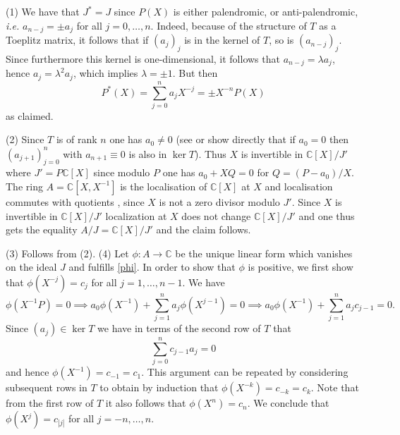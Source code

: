 \documentclass{amsart}
\def\C{{\mathbb C}}
\def\C{{\mathbb C}}
\begin{document}
\proof
(1)
We have that $J^* = J$ since $P(X)$ is either palendromic, or anti-palendromic, {\em i.e.} $a_{n-j} = \pm a_j$ for all $j =0, \ldots, n$. Indeed, because of the structure of $T$ as a Toeplitz matrix, it follows that if $(a_j)_j$ is in the kernel of $T$, so is $(a_{n-j})_j$. Since furthermore this kernel is one-dimensional, it follows that $a_{n-j} = \lambda a_j$, hence $a_j = \lambda^2 a_j$, which implies $\lambda = \pm 1$. But then
$$
P^*(X) = \sum_{j=0}^ n {a_j} X^{-j} =  \pm X ^{-n} P(X)
$$
as claimed. 

(2) Since $T$ is of rank $n$ one has $a_0\neq 0$ (see \cite[Lemma 33]{HP} or show directly that if $a_0=0$ then $(a_{j+1})_{j=0}^n$ with $a_{n+1}\equiv 0$ is also in $\ker T$). Thus $X$ is invertible in $\C[X]/J'$ where $J'=P\C[X]$ since modulo $P$ one has $a_0+ X Q=0$ for $Q=(P-a_0)/X$. The ring $A=\C[X,X^{-1}]$ is the localisation of $\C[X]$ at $X$ and localisation commutes with quotients \cite[Proposition 3.3 and Corollary 3.4]{AM}, since $X$ is not a zero divisor modulo $J'$. Since $X$ is invertible in  $\C[X]/J'$ localization at $X$ does not change  $\C[X]/J'$ and one thus gets the equality $A/J=\C[X]/J'$ and the claim follows. 



(3) Follows from (2).\newline
(4) Let $ \phi : A \to \C$ be the unique linear form which vanishes on the ideal $J$ and fulfills \eqref{phi}.
In order to show that  $ \phi$ is positive, we first show that $\phi(X^{-j} ) = c_j$ for all $j = 1 ,\ldots, n-1$.
We have
$$
 \phi(X^{-1} P) = 0 \implies a_0  \phi (X^{-1} ) + \sum_{j=1}^n a_j  \phi(X^{j-1}) = 0 \implies a_0  \phi (X^{-1} ) + \sum_{j=1}^n a_j c_{j-1} = 0.
$$
Since $(a_j) \in \ker T$ we have in terms of the second row of $T$ that
$$
\sum_{j=0}^n c_{j-1} a_j = 0 
$$
and hence $\phi(X^{-1}) = c_{-1} = c_1$. This argument can be repeated by considering subsequent rows in $T$ to obtain by induction that $\phi(X^{-k}) = c_{-k} = c_k$. Note that from the first row of $T$ it also follows that $\phi(X^n) = c_n$. We conclude that $\phi(X^j) = c_{|j|}$ for all $j = - n, \ldots, n$.
\end{document}
